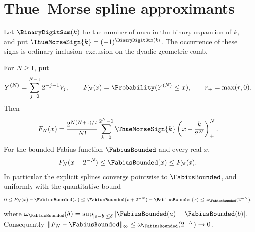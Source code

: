 \section{Thue--Morse spline approximants}
\label{sec:fr-thue-morse}

Let \(\BinaryDigitSum(k)\) be the number of ones in the binary expansion of \(k\), and put
\(\ThueMorseSign{k}=(-1)^{\BinaryDigitSum(k)}\).  The occurrence of these signs is ordinary
inclusion--exclusion on the dyadic geometric comb.

\begin{theorem}
\label{thm:fr-thue-morse-splines}
For \(N\ge1\), put
\[
 Y^{(N)}=\sum_{j=0}^{N-1}2^{-j-1}V_j,
 \qquad F_N(x)=\Probability(Y^{(N)}\le x),
 \qquad r_+=\max(r,0).
\]
Then
\begin{equation}
 F_N(x)=\frac{2^{N(N+1)/2}}{N!}
 \sum_{k=0}^{2^N-1}\ThueMorseSign{k}
 \left(x-\frac{k}{2^N}\right)_+^N.
 \label{eq:fr-thue-morse-spline}
\end{equation}
For the bounded Fabius function \(\FabiusBounded\) and every real \(x\),
\begin{equation}
 F_N(x-2^{-N})\le \FabiusBounded(x)\le F_N(x).
 \label{eq:fr-spline-sandwich}
\end{equation}
In particular the explicit splines converge pointwise to \(\FabiusBounded\), and uniformly
with the quantitative bound
\begin{equation}
 0\le F_N(x)-\FabiusBounded(x)
 \le \FabiusBounded(x+2^{-N})-\FabiusBounded(x)
 \le \omega_{\FabiusBounded}(2^{-N}),
 \label{eq:fr-spline-uniform-bound}
\end{equation}
where
\(\omega_{\FabiusBounded}(\delta)=
\sup_{|a-b|\le\delta}|\FabiusBounded(a)-\FabiusBounded(b)|\).  Consequently
\(\|F_N-\FabiusBounded\|_\infty
\le\omega_{\FabiusBounded}(2^{-N})\to0\).
\end{theorem}

